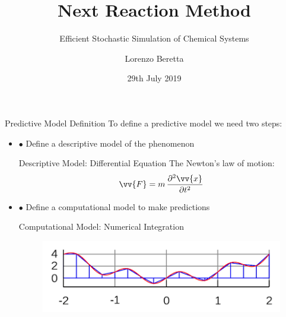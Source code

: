 \documentclass{beamer}
\title{Next Reaction Method}
\subtitle{Efficient Stochastic Simulation of Chemical Systems}
\author{Lorenzo Beretta}
\date{29th July 2019}
\begin{document}
\begin{frame}
  \maketitle
\end{frame}

\begin{frame}{Predictive Model Definition}
  To define a predictive model we need two steps:
  \begin{itemize}
  \item $\bullet$ Define a descriptive model of the phenomenon
    \begin{block}{Descriptive Model: Differential Equation}
      The Newton's law of motion:
      $$ \vv{F} = m \, \frac{\partial^2 \vv{x}}{\partial t^2} $$
    \end{block}
    \pause
  \item $\bullet$ Define a computational model to make predictions
    \begin{block}{Computational Model: Numerical Integration}
      \begin{figure}[h]
        \centering
        \includegraphics[scale=0.6]{num_int}
      \end{figure}
    \end{block}
  \end{itemize}
\end{frame}
\end{document}
